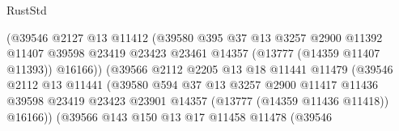 \begin{lexlean}{RustStd}
\begin{coremodule}
                                      (@39546
                                        @2127
                                        @13
                                        @11412
                                        (@39580
                                          @395
                                          @37
                                          @13
                                          @3257
                                          @2900
                                          @11392
                                          @11407
                                          @39598
                                          @23419
                                          @23423
                                          @23461
                                          @14357
                                          (@13777 (@14359 @11407 @11393))
                                          @16166))
                                      (@39566
                                        @2112
                                        @2205
                                        @13
                                        @18
                                        @11441
                                        @11479
                                        (@39546
                                          @2112
                                          @13
                                          @11441
                                          (@39580
                                            @594
                                            @37
                                            @13
                                            @3257
                                            @2900
                                            @11417
                                            @11436
                                            @39598
                                            @23419
                                            @23423
                                            @23901
                                            @14357
                                            (@13777 (@14359 @11436 @11418))
                                            @16166))
                                        (@39566
                                          @143
                                          @150
                                          @13
                                          @17
                                          @11458
                                          @11478
                                          (@39546

\end{coremodule}
\end{lexlean}
